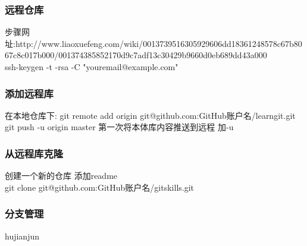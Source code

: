 \documentclass{beamer}
\newcommand{\quotes}[1]{"#1"}
\begin{document}
\begin{CJK}{UTF8}{gkai}
  \begin{frame}\frametitle{远程仓库}
步骤网址:http://www.liaoxuefeng.com/wiki/0013739516305929606dd18361248578c67b8067c8c017b000/001374385852170d9c7adf13c30429b9660d0eb689dd43a000\\
    ssh-keygen -t -rsa -C \quotes{youremail@example.com}\\
  \end{frame}

  \begin{frame}\frametitle{添加远程库}
    在本地仓库下:
    git remote add origin git@github.com:GitHub账户名/learngit.git\\
    git push -u origin master 第一次将本体库内容推送到远程 加-u\\
  \end{frame}

  \begin{frame}\frametitle{从远程库克隆}
    创建一个新的仓库  添加readme\\
    git clone git@github.com:GitHub账户名/gitskills.git\\
  \end{frame}

  \begin{frame}\frametitle{分支管理}
{\tiny hujianjun}
  \end{frame}
  

\end{CJK}
\end{document}
